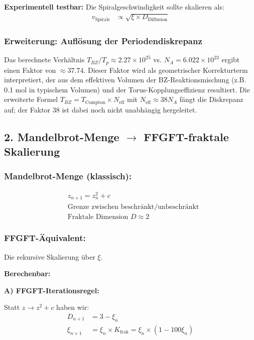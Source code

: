 \textbf{Experimentell testbar:} Die Spiralgeschwindigkeit sollte skalieren als:
\begin{align*}
	v_{\text{Spirale}} &\propto \sqrt{\xi \times D_{\text{Diffusion}}}
\end{align*}

\subsubsection*{Erweiterung: Auflösung der Periodendiskrepanz}
Das berechnete Verhältnis $T_{BZ}/T_p \approx 2.27 \times 10^{25}$ vs. $N_A = 6.022 \times 10^{23}$ ergibt einen Faktor von $\approx 37.74$. Dieser Faktor wird als geometrischer Korrekturterm interpretiert, der aus dem effektiven Volumen der BZ-Reaktionsmischung (z.B. 0.1 mol in typischem Volumen) und der Torus-Kopplungseffizienz resultiert. Die erweiterte Formel $T_{BZ} = T_{\text{Compton}} \times N_{\text{eff}}$ mit $N_{\text{eff}} \approx 38 N_A$ fängt die Diskrepanz auf; der Faktor 38 ist dabei noch nicht unabhängig hergeleitet.

\subsection*{2. Mandelbrot-Menge $\rightarrow$ FFGFT-fraktale Skalierung}

\subsubsection*{Mandelbrot-Menge (klassisch):}
\begin{align*}
	&z_{n+1} = z_n^2 + c \\
	&\text{Grenze zwischen beschränkt/unbeschränkt} \\
	&\text{Fraktale Dimension } D \approx 2
\end{align*}

\subsubsection*{FFGFT-Äquivalent:}
Die rekursive Skalierung über $\xi$.

\textbf{Berechenbar:}

\textbf{A) FFGFT-Iterationsregel:}

Statt $z \to z^2 + c$ haben wir:
\begin{align*}
	D_{n+1} &= 3 - \xi_n \\
	\xi_{n+1} &= \xi_n \times K_{\text{frak}} = \xi_n \times (1 - 100\xi_n)
\end{align*}


